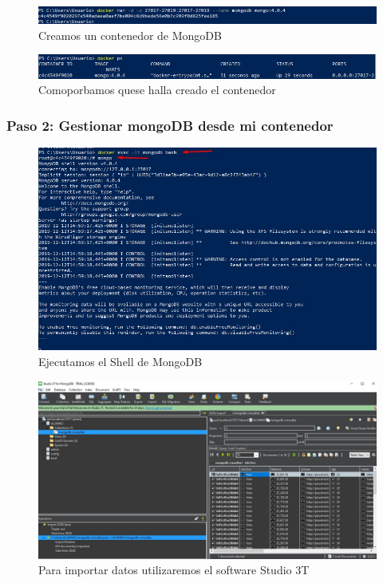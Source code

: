 \documentclass[preprint,12pt]{elsarticle}
\begin{document}
\begin{figure}[H]
	\begin{center}
		\includegraphics[width=12cm]{./IMAGENES/foto3} 
		\caption{Creamos un contenedor de MongoDB}
	\end{center}
\end{figure}

\begin{figure}[H]
	\begin{center}
		\includegraphics[width=12cm]{./IMAGENES/foto4} 
		\caption{Comoporbamos quese halla creado el contenedor}
	\end{center}
\end{figure}

\subsubsection{\textbf{Paso 2: Gestionar mongoDB desde mi contenedor}}

\begin{figure}[H]
	\begin{center}
		\includegraphics[width=12cm]{./IMAGENES/foto5} 
		\caption{Ejecutamos el Shell de MongoDB}
	\end{center}
\end{figure}


\begin{figure}[H]
	\begin{center}
		\includegraphics[width=12cm]{./IMAGENES/foto6} 
		\caption{Para importar datos utilizaremos el software Studio 3T}
	\end{center}
\end{figure}
\end{document}
